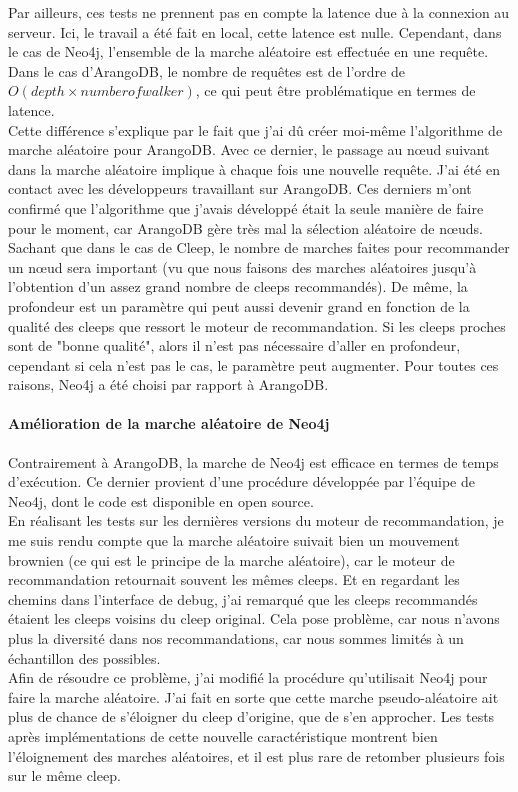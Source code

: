 \documentclass{article} %
\begin{document}
{Par ailleurs, ces tests ne prennent pas en compte la latence due à la connexion au serveur. Ici, le travail a été fait en local, cette latence est nulle. Cependant, dans le cas de Neo4j, l’ensemble de la marche aléatoire est effectuée en une requête. Dans le cas d’ArangoDB, le nombre de requêtes est de l’ordre de $O(depth\times number of walker)$, ce qui peut être problématique en termes de latence.\\
Cette différence s'explique par le fait que j'ai dû créer moi-même l'algorithme de marche aléatoire pour ArangoDB. Avec ce dernier, le passage au nœud suivant dans la marche aléatoire implique à chaque fois une nouvelle requête.  J'ai été en contact avec les développeurs travaillant sur ArangoDB. Ces derniers m'ont confirmé que l'algorithme que j'avais développé était la seule manière de faire pour le moment, car ArangoDB gère très mal la sélection aléatoire de nœuds.\\

Sachant que dans le cas de Cleep, le nombre de marches faites pour recommander un nœud sera important (vu que nous faisons des marches aléatoires jusqu'à l'obtention d'un assez grand nombre de cleeps recommandés). De même, la profondeur est un paramètre qui peut aussi devenir grand en fonction de la qualité des cleeps que ressort le moteur de recommandation. Si les cleeps proches sont de "bonne qualité", alors il n'est pas nécessaire d'aller en profondeur, cependant si cela n'est pas le cas, le paramètre peut augmenter. Pour toutes ces raisons, Neo4j a été choisi par rapport à ArangoDB.

\newpage
\paragraph{Amélioration de la marche aléatoire de Neo4j\\}
Contrairement à ArangoDB, la marche de Neo4j est efficace en termes de temps d'exécution. Ce dernier provient d'une procédure développée par l'équipe de Neo4j, dont le code est disponible en open source.\\
En réalisant les tests sur les dernières versions du moteur de recommandation, je me suis rendu compte que la marche aléatoire suivait bien un mouvement brownien (ce qui est le principe de la marche aléatoire), car le moteur de recommandation retournait souvent les mêmes cleeps. Et en regardant les chemins dans l'interface de debug, j'ai remarqué que les cleeps recommandés étaient les cleeps voisins du cleep original. Cela pose problème, car nous n'avons plus la diversité dans nos recommandations, car nous sommes limités à un échantillon des possibles.\\
Afin de résoudre ce problème, j'ai modifié la procédure qu'utilisait Neo4j pour faire la marche aléatoire. J'ai fait en sorte que cette marche pseudo-aléatoire ait plus de chance de s'éloigner du cleep d'origine, que de s'en approcher. Les tests après implémentations de cette nouvelle caractéristique montrent bien l'éloignement des marches aléatoires, et il est plus rare de retomber plusieurs fois sur le même cleep.

}
\end{document}
